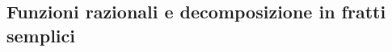 \subsection{Funzioni razionali e decomposizione in fratti semplici}
\label{sec:esercizi-integrali-funzioni-razionali-e-fratti-semplici}
